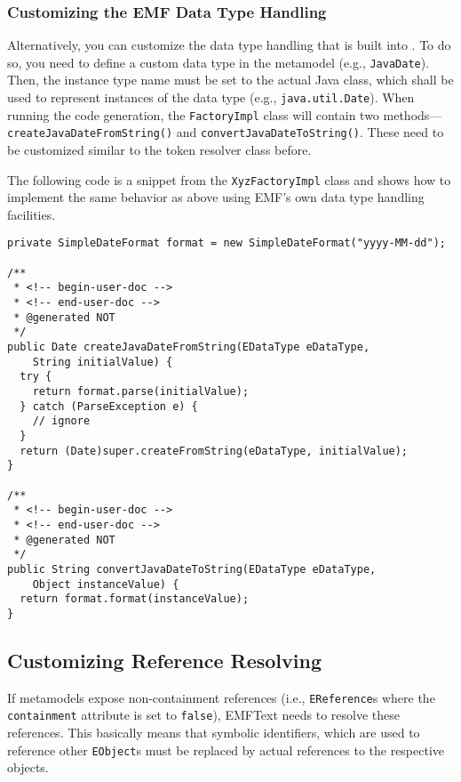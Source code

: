 \subsubsection{Customizing the EMF Data Type Handling}

Alternatively, you can customize the data type handling that is built into \EMF.
To do so, you need to define a custom data type in the metamodel (e.g.,
\texttt{JavaDate}). Then, the instance type name must be set to the actual Java
class, which shall be used to represent instances of the data type (e.g.,
\texttt{java.util.Date}). When running the \EMF code generation, the
\texttt{FactoryImpl} class will contain two
methods---\texttt{createJavaDateFromString()} and
\texttt{convertJavaDateToString()}. These need to be customized similar to the
token resolver class before.

The following code is a snippet from the \texttt{XyzFactoryImpl} class and shows
how to implement the same behavior as above using EMF's own data type handling
facilities.

\begin{lstlisting}
private SimpleDateFormat format = new SimpleDateFormat("yyyy-MM-dd");

/**
 * <!-- begin-user-doc -->
 * <!-- end-user-doc -->
 * @generated NOT
 */
public Date createJavaDateFromString(EDataType eDataType, 
    String initialValue) {
  try {
    return format.parse(initialValue);
  } catch (ParseException e) {
    // ignore
  }
  return (Date)super.createFromString(eDataType, initialValue);
}

/**
 * <!-- begin-user-doc -->
 * <!-- end-user-doc -->
 * @generated NOT
 */
public String convertJavaDateToString(EDataType eDataType, 
    Object instanceValue) {
  return format.format(instanceValue);
}
\end{lstlisting}

\subsection{Customizing Reference Resolving}
\label{sec:cust_reference_resolving}

If metamodels expose non-containment references (i.e., \texttt{EReference}s
where the \texttt{containment} attribute is set to \texttt{false}), EMFText
needs to resolve these references. This basically means that symbolic
identifiers, which are used to reference other \texttt{EObject}s must be
replaced by actual references to the respective objects.

